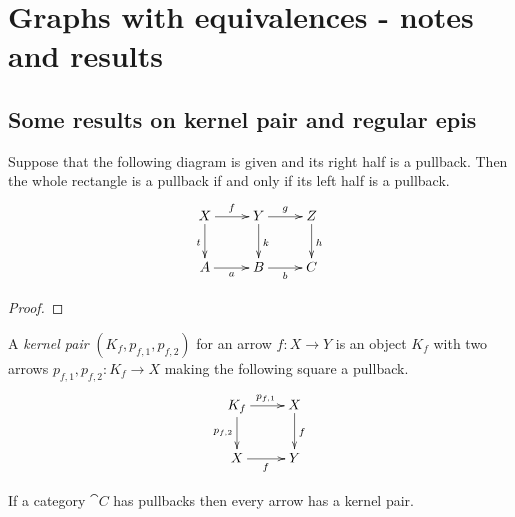 \color{blue}

\section{Graphs with equivalences - notes and results}

\subsection{Some results on kernel pair and regular epis}


\begin{lemma}\label{lem:pb1}
	Suppose that the following diagram is given and its right half is a pullback. Then the whole rectangle is a pullback if and only if its left half is a pullback.
	\[\xymatrix{X\ar[r]^{f} \ar[d]_{t} & Y \ar[d]^{k}\ar[r]^{g} &Z \ar[d]^{h}\\A \ar[r]_{a}& B \ar[r]_{b} & C}\]
\end{lemma}
\begin{proof}
\end{proof}

\begin{definition}A \emph{kernel pair} $(K_f, p_{f, 1}, p_{f,2})$ for an arrow $f\colon X\to Y$ is an object $K_f$ with two arrows $p_{f,1}, p_{f, 2}\colon K_f\to X$ making the following square a pullback.
	\[\xymatrix{K_f \ar[r]^{p_{f,1}} \ar[d]_{p_{f,2}}& X \ar[d]^{f}\\ X \ar[r]_{f} & Y}\]
\end{definition}

\begin{remark}
	If a category $\cat{C}$ has pullbacks then every arrow has a kernel pair.
\end{remark}

